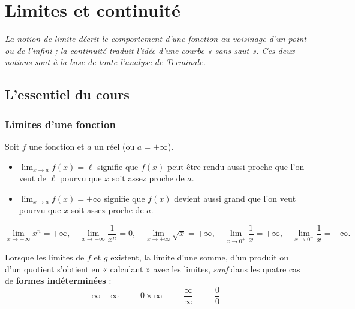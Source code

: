 \chapter{Limites et continuité}

\noindent\textit{La notion de limite décrit le comportement d'une fonction au voisinage
d'un point ou de l'infini ; la continuité traduit l'idée d'une courbe « sans saut ».
Ces deux notions sont à la base de toute l'analyse de Terminale.}
\vspace{8pt}

\section{L'essentiel du cours}

\subsection{Limites d'une fonction}

\begin{definition}
Soit $f$ une fonction et $a$ un réel (ou $a=\pm\infty$).
\begin{itemize}
\item $\displaystyle\lim_{x\to a}f(x)=\ell$ signifie que $f(x)$ peut être rendu aussi proche que l'on veut de $\ell$ pourvu que $x$ soit assez proche de $a$.
\item $\displaystyle\lim_{x\to a}f(x)=+\infty$ signifie que $f(x)$ devient aussi grand que l'on veut pourvu que $x$ soit assez proche de $a$.
\end{itemize}
\end{definition}

\begin{propriete}
\[
\lim_{x\to+\infty}x^{n}=+\infty,\quad
\lim_{x\to+\infty}\frac1{x^{n}}=0,\quad
\lim_{x\to+\infty}\sqrt{x}=+\infty,\quad
\lim_{x\to0^{+}}\frac1x=+\infty,\quad
\lim_{x\to0^{-}}\frac1x=-\infty.
\]
\end{propriete}

\begin{theoreme}
Lorsque les limites de $f$ et $g$ existent, la limite d'une somme, d'un produit ou d'un quotient s'obtient en « calculant » avec les limites, \emph{sauf} dans les quatre cas de \textbf{formes indéterminées} :
\[
\boxed{\;\infty-\infty\;}\qquad\boxed{\;0\times\infty\;}\qquad\boxed{\;\frac{\infty}{\infty}\;}\qquad\boxed{\;\frac{0}{0}\;}
\]
\end{theoreme}

